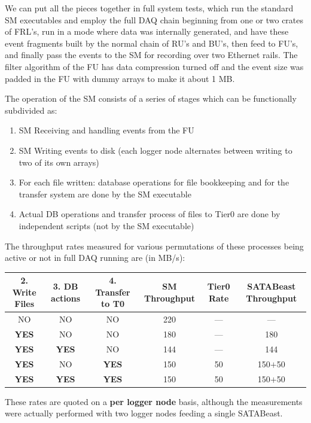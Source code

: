 We can put all the pieces together in full system tests, 
which run the standard SM executables
and employ the full DAQ chain beginning from one or two crates of FRL's,  
run in a  mode where data was internally generated,
and have these event fragments built by the normal chain of RU's and BU's,
then feed to FU's, and finally
pass the events to the SM for recording over two Ethernet rails.
The filter algorithm of the FU has data  compression turned off and 
the event size was padded in the FU with dummy arrays to make it about 1 MB.

The operation of the SM consists of a series of stages which can be
functionally subdivided as:
\begin{enumerate}
  \item SM Receiving and handling events from the FU  
  \item SM Writing events to disk (each logger node alternates between writing to two of its own  arrays)
  \item For each file written: database operations for file bookkeeping and for the transfer system 
        are done by the SM executable
  \item Actual DB operations and transfer process of files to Tier0 are done by independent scripts
        (not by the SM executable) 

\end{enumerate}
The throughput rates measured for various permutations of these processes being
active or not in full DAQ running  are (in MB/s):
\begin{center}
\begin{tabular}{c|c|c|c|c|c} 
2. Write Files & 3. DB actions & 4. Transfer to T0 & SM Throughput  & Tier0 Rate& SATABeast Throughput  \\ \hline
   NO       &   NO       &    NO          &       220      &   --- &   ---       \\
 {\bf YES}  &   NO       &    NO          &       180      &   --- &   180       \\
 {\bf YES}  &  {\bf YES} &    NO          &       144      &   --- &   144       \\
 {\bf YES}  &   NO       &   {\bf YES}    &       150      &    50 &   150$+$50  \\
 {\bf YES}  &  {\bf YES} &   {\bf YES}    &       150      &    50 &   150$+$50  \\
\end{tabular}
\label{tab:rates}
\end{center}
These rates are quoted on  a {\bf per logger node} basis, although the measurements
were actually performed with two logger nodes feeding a single SATABeast.

